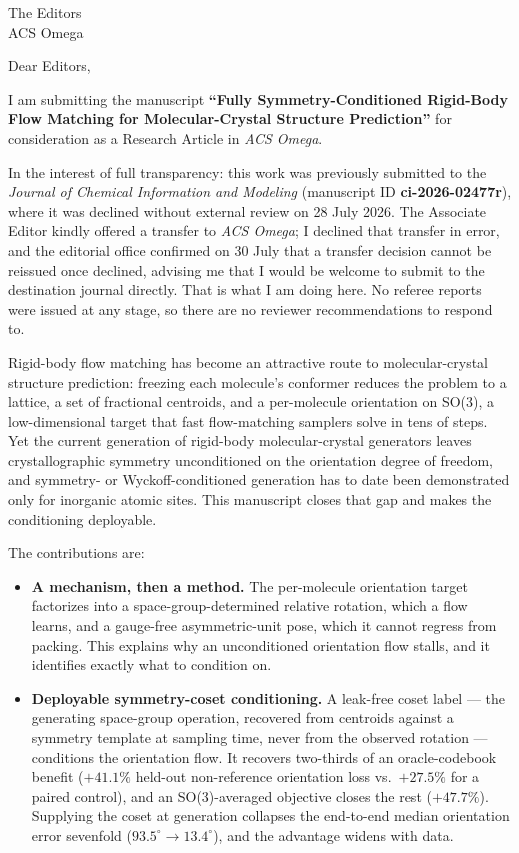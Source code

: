 \documentclass[11pt]{letter}
\begin{document}
\begin{letter}{The Editors\\ACS Omega}
\opening{Dear Editors,}

I am submitting the manuscript \textbf{``Fully Symmetry-Conditioned Rigid-Body
Flow Matching for Molecular-Crystal Structure Prediction''} for consideration as a
Research Article in \textit{ACS Omega}.

In the interest of full transparency: this work was previously submitted to the
\textit{Journal of Chemical Information and Modeling} (manuscript ID
\textbf{ci-2026-02477r}), where it was declined without external review on
28 July 2026. The Associate Editor kindly offered a transfer to \textit{ACS
Omega}; I declined that transfer in error, and the editorial office confirmed on
30 July that a transfer decision cannot be reissued once declined, advising me
that I would be welcome to submit to the destination journal directly. That is
what I am doing here. No referee reports were issued at any stage, so there are no
reviewer recommendations to respond to.

Rigid-body flow matching has become an attractive route to molecular-crystal
structure prediction: freezing each molecule's conformer reduces the problem to a
lattice, a set of fractional centroids, and a per-molecule orientation on SO(3), a
low-dimensional target that fast flow-matching samplers solve in tens of steps.
Yet the current generation of rigid-body molecular-crystal generators leaves
crystallographic symmetry unconditioned on the orientation degree of freedom, and
symmetry- or Wyckoff-conditioned generation has to date been demonstrated only for
inorganic atomic sites. This manuscript closes that gap and makes the conditioning
deployable.

The contributions are:

\begin{itemize}
\item \textbf{A mechanism, then a method.} The per-molecule orientation target
factorizes into a space-group-determined relative rotation, which a flow learns,
and a gauge-free asymmetric-unit pose, which it cannot regress from packing. This
explains why an unconditioned orientation flow stalls, and it identifies exactly
what to condition on.

\item \textbf{Deployable symmetry-coset conditioning.} A leak-free coset label ---
the generating space-group operation, recovered from centroids against a symmetry
template at sampling time, never from the observed rotation --- conditions the
orientation flow. It recovers two-thirds of an oracle-codebook benefit
($+41.1\%$ held-out non-reference orientation loss vs.\ $+27.5\%$ for a paired
control), and an SO(3)-averaged objective closes the rest ($+47.7\%$). Supplying
the coset at generation collapses the end-to-end median orientation error
sevenfold ($93.5^\circ \to 13.4^\circ$), and the advantage widens with data.


\end{itemize}
\end{letter}
\end{document}
